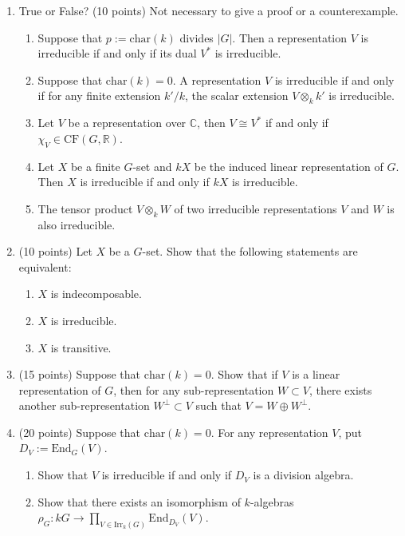 \begin{enumerate}
    \item True or False? (10 points) Not necessary to give a proof or a counterexample.
    \begin{enumerate}
        \item[(1)] Suppose that $p := \mathrm{char}(k)$ divides $|G|$. Then a representation $V$ is irreducible if and only if its dual $V^*$ is irreducible.
        \item[(2)] Suppose that $\mathrm{char}(k) = 0$. A representation $V$ is irreducible if and only if for any finite extension $k'/k$, the scalar extension $V \otimes_k k'$ is irreducible.
        \item[(3)] Let $V$ be a representation over $\mathbb{C}$, then $V \cong V^*$ if and only if $\chi_V \in \mathrm{CF}(G, \mathbb{R})$.
        \item[(4)] Let $X$ be a finite $G$-set and $kX$ be the induced linear representation of $G$. Then $X$ is irreducible if and only if $kX$ is irreducible.
        \item[(5)] The tensor product $V \otimes_k W$ of two irreducible representations $V$ and $W$ is also irreducible.
    \end{enumerate}

    \item (10 points) Let $X$ be a $G$-set. Show that the following statements are equivalent:
    \begin{enumerate}
        \item[(a)] $X$ is indecomposable.
        \item[(b)] $X$ is irreducible.
        \item[(c)] $X$ is transitive.
    \end{enumerate}

    \item (15 points) Suppose that $\mathrm{char}(k) = 0$. Show that if $V$ is a linear representation of $G$, then for any sub-representation $W \subset V$, there exists another sub-representation $W^\perp \subset V$ such that $V = W \oplus W^\perp$.

    \item (20 points) Suppose that $\mathrm{char}(k) = 0$. For any representation $V$, put $D_V := \mathrm{End}_G(V)$.
    \begin{enumerate}
        \item[(1)] Show that $V$ is irreducible if and only if $D_V$ is a division algebra.
        \item[(2)] Show that there exists an isomorphism of $k$-algebras $\rho_G : kG \to \prod_{V \in \mathrm{Irr}_k(G)} \mathrm{End}_{D_V}(V)$.
    \end{enumerate}


\end{enumerate}
